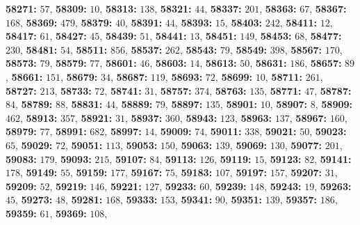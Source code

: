 \textsf{\bfseries 58271:} $57$, \textsf{\bfseries 58309:} $10$, \textsf{\bfseries 58313:} $138$, \textsf{\bfseries 58321:} $44$, \textsf{\bfseries 58337:} $201$, \textsf{\bfseries 58363:} $67$, \textsf{\bfseries 58367:} $168$, \textsf{\bfseries 58369:} $479$, \textsf{\bfseries 58379:} $40$, \textsf{\bfseries 58391:} $44$, \textsf{\bfseries 58393:} $15$, \textsf{\bfseries 58403:} $242$, \textsf{\bfseries 58411:} $12$, \textsf{\bfseries 58417:} $61$, \textsf{\bfseries 58427:} $45$, \textsf{\bfseries 58439:} $51$, \textsf{\bfseries 58441:} $13$, \textsf{\bfseries 58451:} $149$, \textsf{\bfseries 58453:} $68$, \textsf{\bfseries 58477:} $230$, \textsf{\bfseries 58481:} $54$, \textsf{\bfseries 58511:} $856$, \textsf{\bfseries 58537:} $262$, \textsf{\bfseries 58543:} $79$, \textsf{\bfseries 58549:} $398$, \textsf{\bfseries 58567:} $170$, \textsf{\bfseries 58573:} $79$, \textsf{\bfseries 58579:} $77$, \textsf{\bfseries 58601:} $46$, \textsf{\bfseries 58603:} $14$, \textsf{\bfseries 58613:} $50$, \textsf{\bfseries 58631:} $186$, \textsf{\bfseries 58657:} $89$, \textsf{\bfseries 58661:} $151$, \textsf{\bfseries 58679:} $34$, \textsf{\bfseries 58687:} $119$, \textsf{\bfseries 58693:} $72$, \textsf{\bfseries 58699:} $10$, \textsf{\bfseries 58711:} $261$, \textsf{\bfseries 58727:} $213$, \textsf{\bfseries 58733:} $72$, \textsf{\bfseries 58741:} $31$, \textsf{\bfseries 58757:} $374$, \textsf{\bfseries 58763:} $135$, \textsf{\bfseries 58771:} $47$, \textsf{\bfseries 58787:} $84$, \textsf{\bfseries 58789:} $88$, \textsf{\bfseries 58831:} $44$, \textsf{\bfseries 58889:} $79$, \textsf{\bfseries 58897:} $135$, \textsf{\bfseries 58901:} $10$, \textsf{\bfseries 58907:} $8$, \textsf{\bfseries 58909:} $462$, \textsf{\bfseries 58913:} $357$, \textsf{\bfseries 58921:} $31$, \textsf{\bfseries 58937:} $360$, \textsf{\bfseries 58943:} $123$, \textsf{\bfseries 58963:} $137$, \textsf{\bfseries 58967:} $160$, \textsf{\bfseries 58979:} $77$, \textsf{\bfseries 58991:} $682$, \textsf{\bfseries 58997:} $14$, \textsf{\bfseries 59009:} $74$, \textsf{\bfseries 59011:} $338$, \textsf{\bfseries 59021:} $50$, \textsf{\bfseries 59023:} $65$, \textsf{\bfseries 59029:} $72$, \textsf{\bfseries 59051:} $113$, \textsf{\bfseries 59053:} $150$, \textsf{\bfseries 59063:} $139$, \textsf{\bfseries 59069:} $130$, \textsf{\bfseries 59077:} $201$, \textsf{\bfseries 59083:} $179$, \textsf{\bfseries 59093:} $215$, \textsf{\bfseries 59107:} $84$, \textsf{\bfseries 59113:} $126$, \textsf{\bfseries 59119:} $15$, \textsf{\bfseries 59123:} $82$, \textsf{\bfseries 59141:} $178$, \textsf{\bfseries 59149:} $55$, \textsf{\bfseries 59159:} $177$, \textsf{\bfseries 59167:} $75$, \textsf{\bfseries 59183:} $107$, \textsf{\bfseries 59197:} $157$, \textsf{\bfseries 59207:} $31$, \textsf{\bfseries 59209:} $52$, \textsf{\bfseries 59219:} $146$, \textsf{\bfseries 59221:} $127$, \textsf{\bfseries 59233:} $60$, \textsf{\bfseries 59239:} $148$, \textsf{\bfseries 59243:} $19$, \textsf{\bfseries 59263:} $45$, \textsf{\bfseries 59273:} $48$, \textsf{\bfseries 59281:} $168$, \textsf{\bfseries 59333:} $153$, \textsf{\bfseries 59341:} $90$, \textsf{\bfseries 59351:} $139$, \textsf{\bfseries 59357:} $186$, \textsf{\bfseries 59359:} $61$, \textsf{\bfseries 59369:} $108$, 
